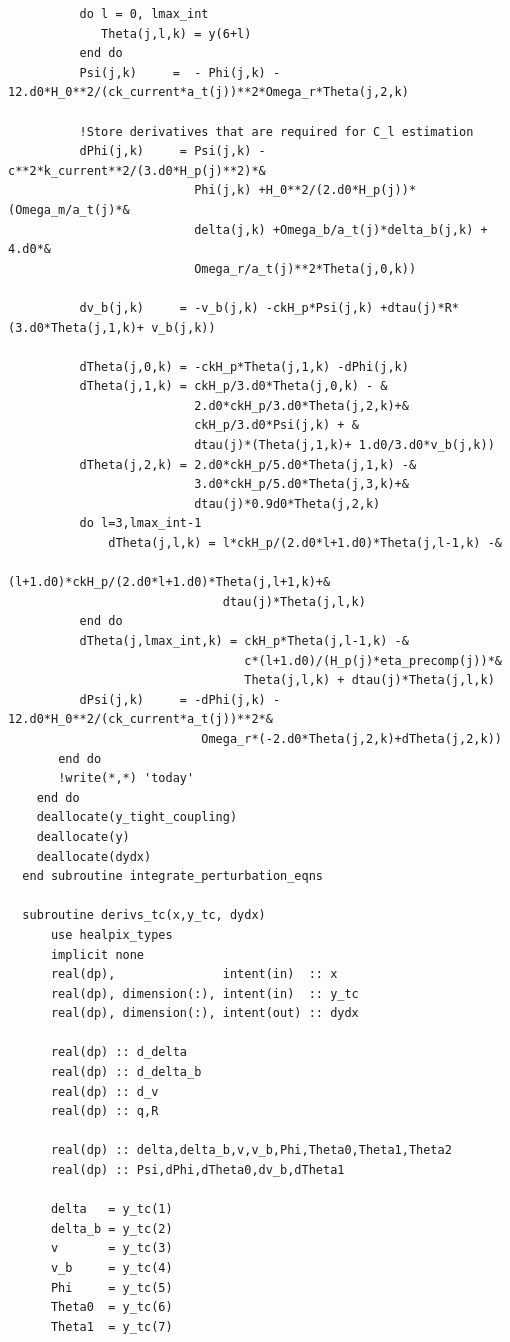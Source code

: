 \documentclass[a4paper]{report}
\begin{document}
\begin{verbatim}
          do l = 0, lmax_int
             Theta(j,l,k) = y(6+l)
          end do
          Psi(j,k)     =  - Phi(j,k) - 12.d0*H_0**2/(ck_current*a_t(j))**2*Omega_r*Theta(j,2,k)

          !Store derivatives that are required for C_l estimation
          dPhi(j,k)     = Psi(j,k) -c**2*k_current**2/(3.d0*H_p(j)**2)*&
                          Phi(j,k) +H_0**2/(2.d0*H_p(j))*(Omega_m/a_t(j)*&
                          delta(j,k) +Omega_b/a_t(j)*delta_b(j,k) + 4.d0*&
                          Omega_r/a_t(j)**2*Theta(j,0,k))

          dv_b(j,k)     = -v_b(j,k) -ckH_p*Psi(j,k) +dtau(j)*R*(3.d0*Theta(j,1,k)+ v_b(j,k))

          dTheta(j,0,k) = -ckH_p*Theta(j,1,k) -dPhi(j,k)
          dTheta(j,1,k) = ckH_p/3.d0*Theta(j,0,k) - &
                          2.d0*ckH_p/3.d0*Theta(j,2,k)+&
                          ckH_p/3.d0*Psi(j,k) + &
                          dtau(j)*(Theta(j,1,k)+ 1.d0/3.d0*v_b(j,k))
          dTheta(j,2,k) = 2.d0*ckH_p/5.d0*Theta(j,1,k) -&
                          3.d0*ckH_p/5.d0*Theta(j,3,k)+&
                          dtau(j)*0.9d0*Theta(j,2,k)
          do l=3,lmax_int-1
              dTheta(j,l,k) = l*ckH_p/(2.d0*l+1.d0)*Theta(j,l-1,k) -&
                              (l+1.d0)*ckH_p/(2.d0*l+1.d0)*Theta(j,l+1,k)+&
                              dtau(j)*Theta(j,l,k)
          end do
          dTheta(j,lmax_int,k) = ckH_p*Theta(j,l-1,k) -&
                                 c*(l+1.d0)/(H_p(j)*eta_precomp(j))*&
                                 Theta(j,l,k) + dtau(j)*Theta(j,l,k)
          dPsi(j,k)     = -dPhi(j,k) - 12.d0*H_0**2/(ck_current*a_t(j))**2*&
                           Omega_r*(-2.d0*Theta(j,2,k)+dTheta(j,2,k))
       end do
       !write(*,*) 'today'
    end do
    deallocate(y_tight_coupling)
    deallocate(y)
    deallocate(dydx)
  end subroutine integrate_perturbation_eqns

  subroutine derivs_tc(x,y_tc, dydx)
      use healpix_types
      implicit none
      real(dp),               intent(in)  :: x
      real(dp), dimension(:), intent(in)  :: y_tc
      real(dp), dimension(:), intent(out) :: dydx

      real(dp) :: d_delta
      real(dp) :: d_delta_b
      real(dp) :: d_v
      real(dp) :: q,R

      real(dp) :: delta,delta_b,v,v_b,Phi,Theta0,Theta1,Theta2
      real(dp) :: Psi,dPhi,dTheta0,dv_b,dTheta1

      delta   = y_tc(1)
      delta_b = y_tc(2)
      v       = y_tc(3)
      v_b     = y_tc(4)
      Phi     = y_tc(5)
      Theta0  = y_tc(6)
      Theta1  = y_tc(7)


\end{verbatim}
\end{document}
